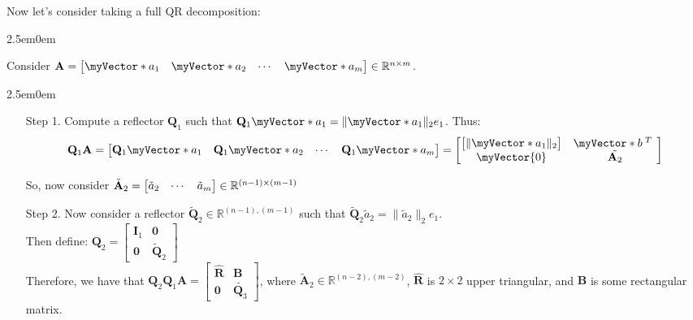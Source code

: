 \documentclass{book}
\newcommand{\hTwo}{%
   \color{MidnightBlue}%
   \fontsize{13}{15}\selectfont%
}
\newenvironment{myIndent}{%
   \begin{adjustwidth}{2.5em}{0em}%
}{%
   \end{adjustwidth}%
}
\newcommand{\retTwo}{\hfill\bigbreak}
\newcommand{\mVec}[1]{\myVector{#1}}
\newcommand{\mVecAst}[1]{\myVector*{#1}}
\newcommand{\mMat}[1]{\mathbf{#1}}
\begin{document}
   Now let's consider taking a full QR decomposition:\\
   {\begin{myIndent} \hTwo
      Consider $\mMat{A} = \begin{bmatrix} \mVecAst{a}_1 & \mVecAst{a}_2 & \cdots & \mVecAst{a}_m \end{bmatrix} \in \mathbb{R}^{n \times m}$.
      
      \begin{myIndent}
         \begin{itemize}
            \item[{\color{BrickRed}Step 1.}] Compute a reflector $\mMat{Q}_1$ such that $\mMat{Q}_1\mVecAst{a}_1 = \|\mVecAst{a}_1\|_2e_1$. Thus:
            \[\mMat{Q}_1\mMat{A} = \begin{bmatrix} \mMat{Q}_1\mVecAst{a}_1 & \mMat{Q}_1\mVecAst{a}_2 & \cdots & \mMat{Q}_1\mVecAst{a}_m \end{bmatrix} = 
            \begin{bmatrix}
               \begin{bmatrix}
                  \|\mVecAst{a}_1\|_2
               \end{bmatrix} & \mVecAst{b}^{\phantom{|}T\phantom{1}} \\
               \mVec{0} & \tilde{\mMat{A}_2}
            \end{bmatrix}\]
   
            So, now consider $\tilde{\mMat{A}}_2 = \begin{bmatrix}\Tilde{a}_2 & \cdots & \Tilde{a}_m \end{bmatrix} \in \mathbb{R}^{(n-1) \times (m-1)}$ \retTwo
   
            \item[{\color{BrickRed}Step 2.}] Now consider a reflector $\tilde{\mMat{Q}}_2 \in \mathbb{R}^{(n-1), (m-1)}$ such that $\tilde{\mMat{Q}}_2\tilde{a}_2 = \|\tilde{a}_2\|_2e_1$.\\
            Then define: ${\displaystyle \mMat{Q}_2 = \begin{bmatrix} \mMat{I}_1 & \mMat{0} \\ \mMat{0} & \tilde{\mMat{Q}}_2\end{bmatrix}}$\\
            Therefore, we have that
            $\mMat{Q}_2\mMat{Q}_1\mMat{A} = 
            \begin{bmatrix}
               \hat{\mMat{R}} & \mMat{B} \\ \mMat{0} & \tilde{\mMat{Q}_3}
            \end{bmatrix}$, where $\tilde{\mMat{A}}_2 \in \mathbb{R}^{(n-2),(m-2)}$, $\hat{\mMat{R}}$ is $2 \times 2$ upper triangular, and $\mMat{B}$ is some rectangular matrix.
            

\end{itemize}
\end{myIndent}
\end{myIndent}}
\end{document}
